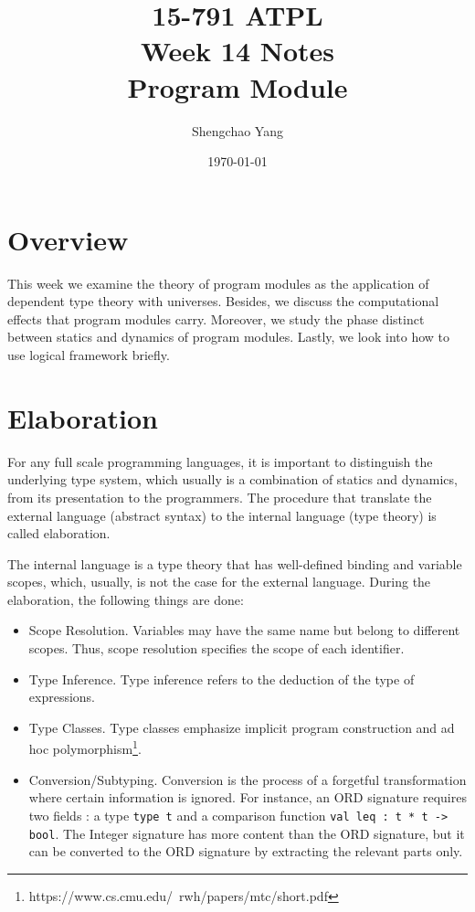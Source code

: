 \documentclass[11pt]{article}
\title{15-791 ATPL \\ Week 14 Notes \\ Program Module}
\author{Shengchao Yang}
\date{\today}
\begin{document}
\maketitle{}
\section*{Overview}
This week we examine the theory of program modules as the application of dependent type theory with universes.
Besides, we discuss the computational effects that program modules carry. Moreover, 
we study the phase distinct between statics and dynamics of program modules.
Lastly, we look into how to use logical framework briefly.
\section*{Elaboration}
For any full scale programming languages, it is important to distinguish 
the underlying type system, which usually is a combination of statics and dynamics, from its presentation to the programmers.
The procedure that translate the external language (abstract syntax) to the internal language (type theory) is called elaboration.

The internal language is a type theory that has well-defined binding and variable scopes,
which, usually, is not the case for the external language. 
During the elaboration, the following things are done:
\begin{itemize}
    \item Scope Resolution. Variables may have the same name but belong to different scopes.
    Thus, scope resolution specifies the scope of each identifier.
    \item Type Inference. Type inference refers to the deduction of the type of expressions.
    \item Type Classes. Type classes emphasize implicit program construction and
    ad hoc polymorphism\footnote{https://www.cs.cmu.edu/~rwh/papers/mtc/short.pdf}. 
    \item Conversion/Subtyping. Conversion is the process of a forgetful transformation where certain information is ignored.
    For instance, an ORD signature requires two fields : a type \texttt{type t} and a comparison function \texttt{val leq : t * t -> bool}.
    The Integer signature has more content than the ORD signature, but it can be converted to the ORD signature by extracting the relevant parts only.
\end{itemize} 
\end{document}
